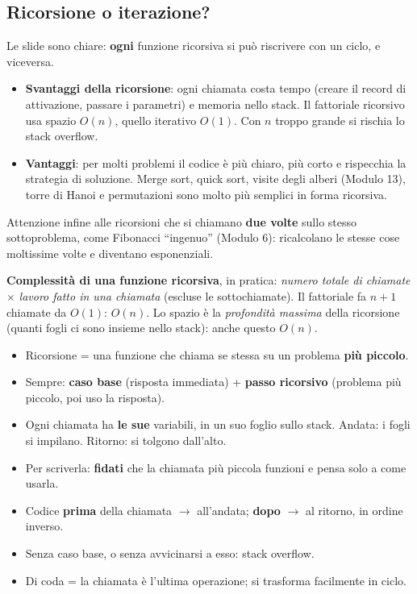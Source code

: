 \subsection*{Ricorsione o iterazione?}

Le slide sono chiare: \textbf{ogni} funzione ricorsiva si può riscrivere con un
ciclo, e viceversa.
\begin{itemize}
  \item \textbf{Svantaggi della ricorsione}: ogni chiamata costa tempo (creare il
        record di attivazione, passare i parametri) e memoria nello stack. Il
        fattoriale ricorsivo usa spazio $O(n)$, quello iterativo $O(1)$. Con $n$
        troppo grande si rischia lo stack overflow.
  \item \textbf{Vantaggi}: per molti problemi il codice è più chiaro, più corto e
        rispecchia la strategia di soluzione. Merge sort, quick sort, visite degli
        alberi (Modulo 13), torre di Hanoi e permutazioni sono molto più semplici in
        forma ricorsiva.
\end{itemize}
Attenzione infine alle ricorsioni che si chiamano \textbf{due volte} sullo stesso
sottoproblema, come Fibonacci ``ingenuo'' (Modulo 6): ricalcolano le stesse cose
moltissime volte e diventano esponenziali.

\textbf{Complessità di una funzione ricorsiva}, in pratica: \emph{numero totale di
chiamate} $\times$ \emph{lavoro fatto in una chiamata} (escluse le sottochiamate).
Il fattoriale fa $n + 1$ chiamate da $O(1)$: $O(n)$. Lo spazio è la
\emph{profondità massima} della ricorsione (quanti fogli ci sono insieme nello
stack): anche questo $O(n)$.

\begin{inparole}
\begin{itemize}
  \item Ricorsione = una funzione che chiama se stessa su un problema \textbf{più piccolo}.
  \item Sempre: \textbf{caso base} (risposta immediata) + \textbf{passo ricorsivo}
        (problema più piccolo, poi uso la risposta).
  \item Ogni chiamata ha \textbf{le sue} variabili, in un suo foglio sullo stack.
        Andata: i fogli si impilano. Ritorno: si tolgono dall'alto.
  \item Per scriverla: \textbf{fidati} che la chiamata più piccola funzioni e pensa
        solo a come usarla.
  \item Codice \textbf{prima} della chiamata $\to$ all'andata; \textbf{dopo} $\to$
        al ritorno, in ordine inverso.
  \item Senza caso base, o senza avvicinarsi a esso: stack overflow.
  \item Di coda = la chiamata è l'ultima operazione; si trasforma facilmente in ciclo.
\end{itemize}
\end{inparole}

